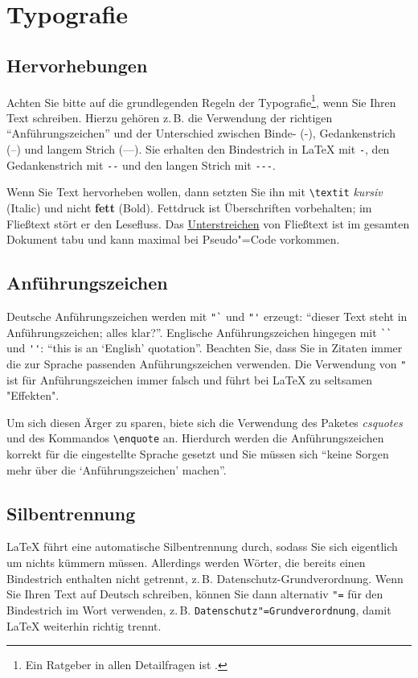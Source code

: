 \chapter{Typografie}

\section{Hervorhebungen}
\label{Einleitung:Textauszeichnungen}

Achten Sie bitte auf die grundlegenden Regeln der Typografie\footnote{Ein Ratgeber in allen Detailfragen ist \cite{Forssman2002}.}, wenn Sie Ihren Text schreiben. Hierzu gehören z.\,B. die Verwendung der richtigen "`Anführungszeichen"' und der Unterschied zwischen Binde- (-), Gedankenstrich (--) und langem Strich (---). Sie erhalten den Bindestrich in \LaTeX{} mit \verb+-+, den Gedankenstrich mit \verb+--+ und den langen Strich mit \verb+---+.

Wenn Sie Text hervorheben wollen, dann setzten Sie ihn mit \verb+\textit+ \textit{kursiv} (Italic) und nicht \textbf{fett} (Bold). Fettdruck ist Überschriften vorbehalten; im Fließtext stört er den Lesefluss. Das \underline{Unterstreichen} von Fließtext ist im gesamten Dokument tabu und kann maximal bei Pseudo"=Code vorkommen.


\section{Anführungszeichen}

Deutsche Anführungszeichen werden mit \verb+"`+ und \verb+"'+ erzeugt: "`dieser Text steht in \glq Anführungszeichen\grq; alles klar?"'. Englische Anführungszeichen hingegen mit \verb+``+ und \verb+''+: ``this is an `English' quotation''. Beachten Sie, dass Sie in Zitaten immer die zur Sprache passenden Anführungszeichen verwenden. Die Verwendung von \verb+"+ ist für Anführungszeichen immer falsch und führt bei \LaTeX{} zu seltsamen "Effekten".

Um sich diesen Ärger zu sparen, biete sich die Verwendung des Paketes \textit{csquotes} und des Kommandos \verb+\enquote+ an. Hierdurch werden die Anführungszeichen korrekt für die eingestellte Sprache gesetzt und Sie müssen sich \enquote{keine Sorgen mehr über die \enquote{Anführungszeichen} machen}.


\section{Silbentrennung}
\LaTeX{} führt eine automatische Silbentrennung durch, sodass Sie sich eigentlich um nichts kümmern müssen. Allerdings werden Wörter, die bereits einen Bindestrich enthalten nicht getrennt, z.\,B. Datenschutz-Grundverordnung. Wenn Sie Ihren Text auf Deutsch schreiben, können Sie dann alternativ \verb+"=+ für den Bindestrich im Wort verwenden, z.\,B. \verb+Datenschutz"=Grundverordnung+, damit \LaTeX{}  weiterhin richtig trennt.

